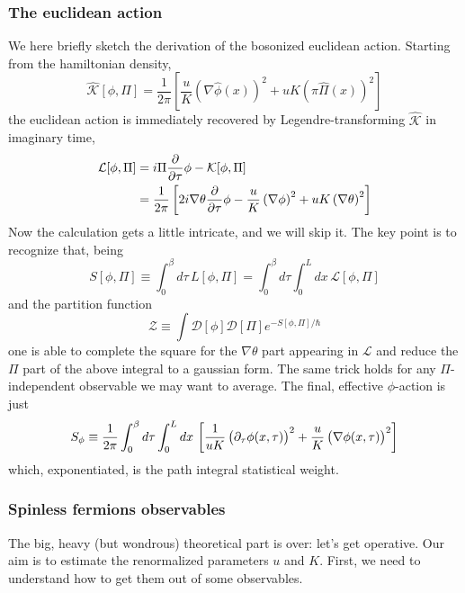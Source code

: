 \subsubsection{The euclidean action}

We here briefly sketch the derivation of the bosonized euclidean action. Starting from the hamiltonian density,
\[
	\hat{\mathcal{K}}[\phi, \Pi] = \frac{1}{2\pi} \left[
			\frac{u}{K} \left( \nabla \hat \phi(x) \right)^2 + uK \left( \pi \hat \Pi(x) \right)^2
	\right]
\]
the euclidean action is immediately recovered by Legendre-transforming $\hat{\mathcal{K}}$ in imaginary time,
\[
	\begin{aligned}
		\mathcal{L}[\phi, \Pi] &= i \Pi \pdv{\tau} \phi - \mathcal{K} [\phi, \Pi] \\
		&= \frac{1}{2\pi} \left[
			2i \nabla \theta \pdv{\tau} \phi
			- \frac{u}{K} \left( \nabla \phi \right)^2 + uK \left( \nabla \theta \right)^2
		\right]
	\end{aligned}
\]
Now the calculation gets a little intricate, and we will skip it. The key point is to recognize that, being
\[
	S[\phi, \Pi] \equiv \int_0^\beta d\tau \, L[\phi, \Pi] = \int_0^\beta d\tau \int_0^L dx \,  \mathcal{L}[\phi, \Pi]
\]
and the partition function
\[
	\mathcal{Z} \equiv \int \mathcal{D}[\phi] \mathcal{D}[\Pi] e^{-S[\phi, \Pi] /\hbar}
\]
one is able to complete the square for the $\nabla \theta$ part appearing in $\mathcal{L}$ and reduce the $\Pi$ part of the above integral to a gaussian form. The same trick holds for any $\Pi$-independent observable we may want to average. The final, effective $\phi$-action is just
\begin{equation}\label{eq:phi-action}
	S_\phi \equiv \frac{1}{2\pi} \int_0^\beta d\tau \int_0^L dx \, \left[
		\frac{1}{uK} \left(
			\vphantom{A^A}
			\partial_\tau \phi(x,\tau)
		\right)^2 + \frac{u}{K} \left(
			\vphantom{A^A}
			\nabla \phi(x,\tau) 
		\right)^2
	\right]
\end{equation}
which, exponentiated, is the path integral statistical weight.

\subsubsection{Spinless fermions observables}

The big, heavy (but wondrous) theoretical part is over: let's get operative. Our aim is to estimate the renormalized parameters $u$ and $K$. First, we need to understand how to get them out of some observables.

